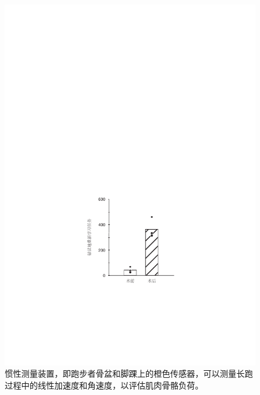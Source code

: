 \begin{figure}[!htb]
	\centering
	\includegraphics[width=0.6\linewidth]{chap7/7_3}
	\caption{惯性测量装置，即跑步者骨盆和脚踝上的橙色传感器，可以测量长跑过程中的线性加速度和角速度，以评估肌肉骨骼负荷。 \label{fig:7_3}}
\end{figure}


